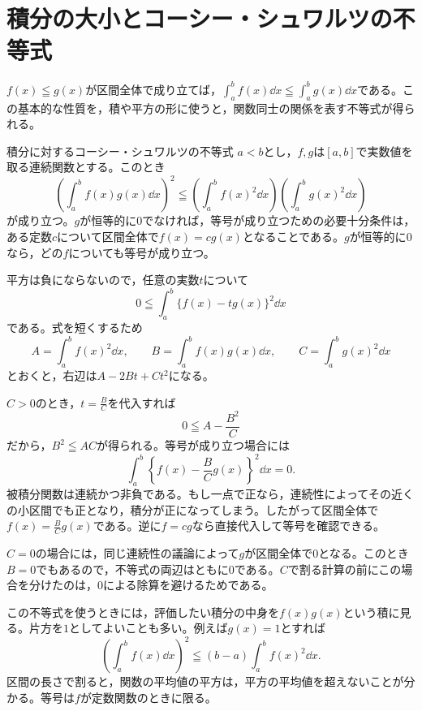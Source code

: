 \section{積分の大小とコーシー・シュワルツの不等式}\label{節:積分の不等式}

$f(x)\leqq g(x)$が区間全体で成り立てば，$\int_a^b f(x)\dd x\leqq\int_a^b g(x)\dd x$である。この基本的な性質を，積や平方の形に使うと，関数同士の関係を表す不等式が得られる。

\begin{theorem}{積分に対するコーシー・シュワルツの不等式}
$a<b$とし，$f,g$は$[a,b]$で実数値を取る連続関数とする。このとき
\begin{equation}\label{式:積分のコーシーシュワルツ}
 \left(\int_a^b f(x)g(x)\dd x\right)^2
 \leqq
 \left(\int_a^b f(x)^2\dd x\right)
 \left(\int_a^b g(x)^2\dd x\right)
\end{equation}
が成り立つ。$g$が恒等的に$0$でなければ，等号が成り立つための必要十分条件は，ある定数$c$について区間全体で$f(x)=cg(x)$となることである。$g$が恒等的に$0$なら，どの$f$についても等号が成り立つ。
\end{theorem}

平方は負にならないので，任意の実数$t$について
\[
 0\leqq\int_a^b\{f(x)-tg(x)\}^2\dd x
\]
である。式を短くするため
\[
 A=\int_a^b f(x)^2\dd x,\qquad
 B=\int_a^b f(x)g(x)\dd x,\qquad
 C=\int_a^b g(x)^2\dd x
\]
とおくと，右辺は$A-2Bt+Ct^2$になる。

$C>0$のとき，$t=\frac BC$を代入すれば
\[
 0\leqq A-\frac{B^2}{C}
\]
だから，$B^2\leqq AC$が得られる。等号が成り立つ場合には
\[
 \int_a^b\left\{f(x)-\frac BCg(x)\right\}^2\dd x=0.
\]
被積分関数は連続かつ非負である。もし一点で正なら，連続性によってその近くの小区間でも正となり，積分が正になってしまう。したがって区間全体で$f(x)=\frac BCg(x)$である。逆に$f=cg$なら直接代入して等号を確認できる。

$C=0$の場合には，同じ連続性の議論によって$g$が区間全体で$0$となる。このとき$B=0$でもあるので，不等式の両辺はともに$0$である。$C$で割る計算の前にこの場合を分けたのは，$0$による除算を避けるためである。

この不等式を使うときには，評価したい積分の中身を$f(x)g(x)$という積に見る。片方を$1$としてよいことも多い。例えば$g(x)=1$とすれば
\begin{equation}\label{式:平均と二乗平均}
 \left(\int_a^b f(x)\dd x\right)^2
 \leqq(b-a)\int_a^b f(x)^2\dd x.
\end{equation}
区間の長さで割ると，関数の平均値の平方は，平方の平均値を超えないことが分かる。等号は$f$が定数関数のときに限る。

